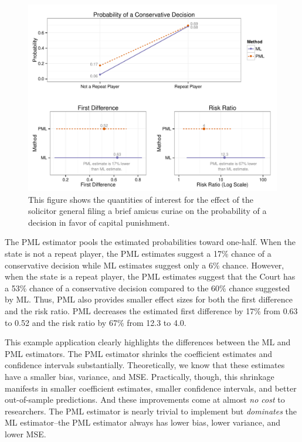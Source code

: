\documentclass[12pt]{article}
\begin{document}
\begin{figure}[h]
\begin{center}
\includegraphics[width = \textwidth]{figs/ge-qis.pdf}
\caption{This figure shows the quantities of interest for the effect of the solicitor general filing a brief amicus curiae on the probability of a decision in favor of capital punishment.}\label{fig:ge-qis}
\end{center}
\end{figure}

The PML estimator pools the estimated probabilities toward one-half. When the state is not a repeat player, the PML estimates suggest a 17\% chance of a conservative decision while ML estimates suggest only a 6\% chance.
However, when the state is a repeat player, the PML estimates suggest that the Court has a 53\% chance of a conservative decision compared to the 60\% chance suggested by ML.
Thus, PML also provides smaller effect sizes for both the first difference and the risk ratio.
PML decreases the estimated first difference by 17\% from 0.63 to 0.52 and the risk ratio by 67\% from 12.3 to 4.0.

This example application clearly highlights the differences between the ML and PML estimators. 
The PML estimator shrinks the coefficient estimates and confidence intervals substantially. 
Theoretically, we know that these estimates have a smaller bias, variance, and MSE.
Practically, though, this shrinkage manifests in smaller coefficient estimates, smaller confidence intervals, and better out-of-sample predictions.
And these improvements come at almost \textit{no cost} to researchers. 
The PML estimator is nearly trivial to implement but \textit{dominates} the ML estimator--the PML estimator always has lower bias, lower variance, and lower MSE.
\end{document}
